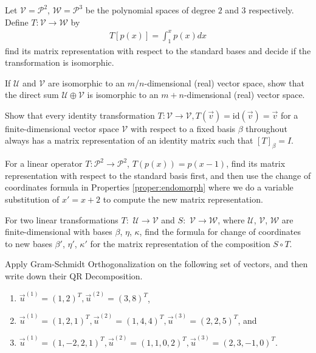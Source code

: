 \begin{Exercise}
Let $\mathcal{V} = \mathcal{P}^2$, $\mathcal{W} = \mathcal{P}^3$ be the polynomial spaces of degree $2$ and $3$ respectively. Define $T: \mathcal{V} \to \mathcal{W}$ by
\begin{align*}
T[p(x)] = \int_1^x p(x) dx
\end{align*}
find its matrix representation with respect to the standard bases and decide if the transformation is isomorphic.
\end{Exercise}

\begin{Exercise}
If $\mathcal{U}$ and $\mathcal{V}$ are isomorphic to an $m$/$n$-dimensional (real) vector space, show that the direct sum $\mathcal{U} \oplus \mathcal{V}$ is isomorphic to an $m+n$-dimensional (real) vector space.
\end{Exercise}

\begin{Exercise}
Show that every identity transformation $T: \mathcal{V} \to \mathcal{V}, T(\vec{v}) = \text{id}(\vec{v}) = \vec{v}$ for a finite-dimensional vector space $\mathcal{V}$ with respect to a fixed basis $\mathcal{\beta}$ throughout always has a matrix representation of an identity matrix such that $[T]_\beta = I$. 
\end{Exercise}

\begin{Exercise}
For a linear operator $T: \mathcal{P}^2 \to \mathcal{P}^2$, $T(p(x)) = p(x-1)$, find its matrix representation with respect to the standard basis first, and then use the change of coordinates formula in Properties \ref{proper:endomorph} where we do a variable substitution of $x' = x+2$ to compute the new matrix representation.
\end{Exercise}

\begin{Exercise}
For two linear transformations $T:$ $\mathcal{U} \to \mathcal{V}$ and $S:$ $\mathcal{V} \to \mathcal{W}$, where $\mathcal{U}$, $\mathcal{V}$, $\mathcal{W}$ are finite-dimensional with bases $\mathcal{\beta}$, $\mathcal{\eta}$, $\mathcal{\kappa}$, find the formula for change of coordinates to new bases $\mathcal{\beta}'$, $\mathcal{\eta}'$, $\mathcal{\kappa}'$ for the matrix representation of the composition $S \circ T$.
\end{Exercise}

\begin{Exercise}
Apply Gram-Schmidt Orthogonalization on the following set of vectors, and then write down their QR Decomposition.
\begin{enumerate}[label=(\alph*)]
\item $\vec{u}^{(1)} = (1,2)^T, \vec{u}^{(2)} = (3,8)^T$,
\item $\vec{u}^{(1)} = (1,2,1)^T, \vec{u}^{(2)} = (1,4,4)^T, \vec{u}^{(3)} = (2,2,5)^T$, and
\item $\vec{u}^{(1)} = (1,-2,2,1)^T, \vec{u}^{(2)} = (1,1,0,2)^T, \vec{u}^{(3)} = (2,3,-1,0)^T$.
\end{enumerate}  
\end{Exercise}